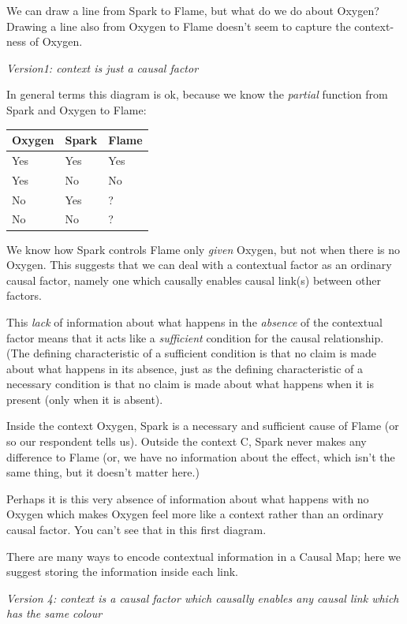 \documentclass[
]{book}
\begin{document}
We can draw a line from Spark to Flame, but what do we do about Oxygen? Drawing a line also from Oxygen to Flame doesn't seem to capture the context-ness of Oxygen.

\emph{Version1: context is just a causal factor}

In general terms this diagram is ok, because we know the \emph{partial} function from Spark and Oxygen to Flame:

\begin{longtable}[]{@{}lll@{}}
\toprule
Oxygen & Spark & Flame \\
\midrule
\endhead
Yes & Yes & Yes \\
Yes & No & No \\
No & Yes & ? \\
No & No & ? \\
\bottomrule
\end{longtable}

We know how Spark controls Flame only \emph{given} Oxygen, but not when there is no Oxygen. This suggests that we can deal with a contextual factor as an ordinary causal factor, namely one which causally enables causal link(s) between other factors.

This \emph{lack} of information about what happens in the \emph{absence} of the contextual factor means that it acts like a \emph{sufficient} condition for the causal relationship. (The defining characteristic of a sufficient condition is that no claim is made about what happens in its absence, just as the defining characteristic of a necessary condition is that no claim is made about what happens when it is present (only when it is absent).

Inside the context Oxygen, Spark is a necessary and sufficient cause of Flame (or so our respondent tells us). Outside the context C, Spark never makes any difference to Flame (or, we have no information about the effect, which isn't the same thing, but it doesn't matter here.)

Perhaps it is this very absence of information about what happens with no Oxygen which makes Oxygen feel more like a context rather than an ordinary causal factor. You can't see that in this first diagram.

There are many ways to encode contextual information in a Causal Map; here we suggest storing the information inside each link.

\emph{Version 4: context is a causal factor which causally enables any causal link which has the same colour}
\end{document}
